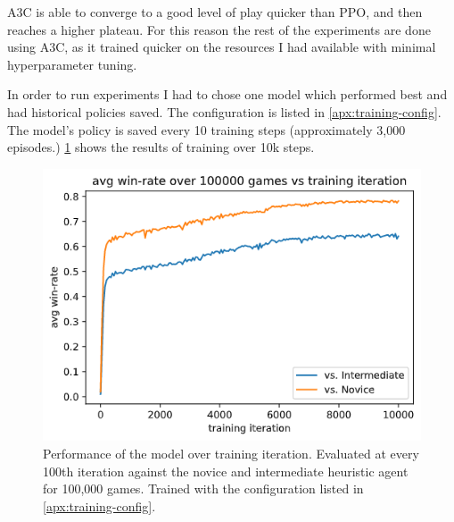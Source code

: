 \documentclass[../main.tex]{subfiles}
\begin{document}
A3C is able to converge to a good level of play quicker than PPO, and then reaches a higher plateau. For this reason the rest of the experiments are done using A3C, as it trained quicker on the resources I had available with minimal hyperparameter tuning. 

In order to run experiments I had to chose one model which performed best and had historical policies saved. The configuration is listed in \cref{apx:training-config}. The model's policy is saved every 10 training steps (approximately 3,000 episodes.) \cref{fig:model_vs_rules} shows the results of training over 10k steps. 

\begin{figure}
    \centering
    \includegraphics[width=\textwidth,keepaspectratio]{images/method/rules_vs_models.png}
    \caption{Performance of the model over training iteration. Evaluated at every 100th iteration against the novice and intermediate heuristic agent for 100,000 games. Trained with the configuration listed in \cref{apx:training-config}.}
    \label{fig:model_vs_rules}
\end{figure}
\end{document}
